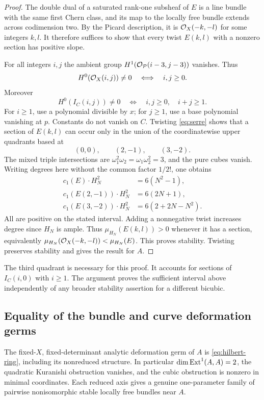 \begin{proof}
The double dual of a saturated rank-one subsheaf of $E$ is a line
bundle with the same first Chern class, and its map to the locally
free bundle extends across codimension two. By the Picard
description, it is $\mathcal O_X(-k,-l)$ for some integers $k,l$.
It therefore suffices to show that every twist $E(k,l)$ with a
nonzero section has positive slope.

For all integers $i,j$ the ambient group
$H^1(\mathcal O_{\mathcal P}(i-3,j-3))$ vanishes. Thus
\[
 H^0(\mathcal O_X(i,j))\ne0\quad\Longleftrightarrow\quad i,j\ge0 .
\]
Moreover
\[
 H^0(I_C(i,j))\ne0
 \quad\Longleftrightarrow\quad i,j\ge0,\quad i+j\ge1.
\]
For $i\ge1$, use a polynomial divisible by $x$; for $j\ge1$,
use a base polynomial vanishing at $p$. Constants do not vanish on
$C$. Twisting \eqref{eq:serre} shows that a section of $E(k,l)$
can occur only in the union of the coordinatewise upper quadrants
based at
\[
 (0,0),\qquad (2,-1),\qquad (3,-2).
\]
The mixed triple intersections are
$\omega_1^2\omega_2=\omega_1\omega_2^2=3$, and the pure cubes
vanish. Writing degrees here without the common factor $1/2!$,
one obtains
\begin{equation}\label{eq:three-degrees}
 \begin{aligned}
 c_1(E)\cdot H_N^2&=6(N^2-1),\\
 c_1(E(2,-1))\cdot H_N^2&=6(2N+1),\\
 c_1(E(3,-2))\cdot H_N^2&=6(2+2N-N^2).
 \end{aligned}
\end{equation}
All are positive on the stated interval.
Adding a nonnegative twist increases degree since $H_N$ is ample.
Thus $\mu_{H_N}(E(k,l))>0$ whenever it has a section, equivalently
$\mu_{H_N}(\mathcal O_X(-k,-l))<\mu_{H_N}(E)$.
This proves stability. Twisting preserves stability and gives
the result for $A$.
\end{proof}

The third quadrant is necessary for this proof. It accounts for
sections of $I_C(i,0)$ with $i\ge1$.
The argument proves the sufficient interval above independently of
any broader stability assertion for a different bicubic.

\subsection{Equality of the bundle and curve deformation germs}

\begin{theorem}\label{thm:cubic-bundle}
The fixed-$X$, fixed-determinant analytic deformation germ of $A$
is \eqref{eq:hilbert-ring}, including its nonreduced structure.
In particular $\dim\operatorname{Ext}^1(A,A)=2$, the quadratic Kuranishi
obstruction vanishes, and the cubic obstruction is nonzero in
minimal coordinates. Each reduced axis gives a genuine
one-parameter family of pairwise nonisomorphic stable locally
free bundles near $A$.
\end{theorem}

